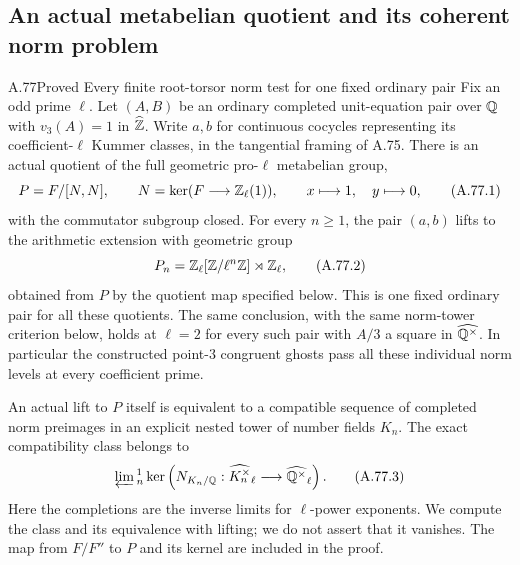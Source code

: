 \subsection{An actual metabelian quotient and its coherent norm problem}

\begin{statement}{A.77}{Proved}
{Every finite root-torsor norm test for one fixed ordinary pair}
Fix an odd prime $\ell$.  Let $(A,B)$ be an ordinary completed
unit-equation pair over $\mathbb Q$ with $v_3(A)=1$ in $\widehat{\mathbb Z}$.
Write $a,b$ for continuous cocycles representing its coefficient-$\ell$
Kummer classes, in the tangential framing of A.75.
There is an actual quotient of the full geometric pro-$\ell$
metabelian group,
\[
 P=F/[N,N],\qquad N=\ker(F\longrightarrow\mathbb Z_\ell(1)),
 \qquad x\longmapsto1,\quad y\longmapsto0,
 \tag{A.77.1}
\]
with the commutator subgroup closed.  For every $n\ge1$,
the pair $(a,b)$ lifts to the arithmetic extension with geometric group
\[
 P_n=\mathbb Z_\ell[\mathbb Z/\ell^n\mathbb Z]\rtimes\mathbb Z_\ell,
 \tag{A.77.2}
\]
obtained from $P$ by the quotient map specified below.
This is one fixed ordinary pair for all these quotients.
The same conclusion, with the same norm-tower criterion below,
holds at $\ell=2$ for every such pair with $A/3$ a square
in $\widehat{\mathbb Q^\times}$.  In particular the constructed
point-$3$ congruent ghosts pass all these individual norm
levels at every coefficient prime.

An actual lift to $P$ itself is equivalent to a compatible sequence
of completed norm preimages in an explicit nested tower of number
fields $K_n$.  The exact compatibility class belongs to
\[
 \varprojlim{}^1_n
 \ker\left(N_{K_n/\mathbb Q}:
     \widehat{K_n^\times}_{\ell}\longrightarrow
     \widehat{\mathbb Q^\times}_{\ell}\right).
 \tag{A.77.3}
\]
Here the completions are the inverse limits for $\ell$-power
exponents.  We compute the class and its equivalence with lifting;
we do not assert that it vanishes.  The map from $F/F''$ to $P$
and its kernel are included in the proof.
\end{statement}
